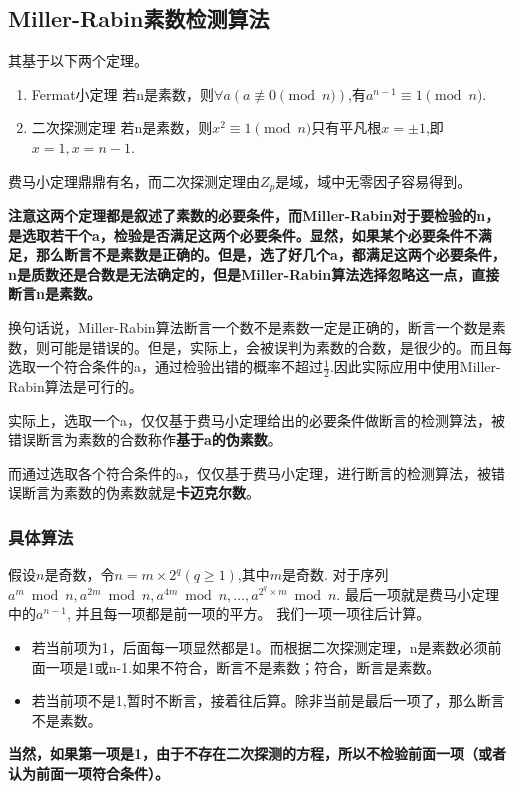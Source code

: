 \subsection{Miller-Rabin素数检测算法}
其基于以下两个定理。
\begin{enumerate}
    \item Fermat小定理 若n是素数，则$\forall a(a \not\equiv 0 \pmod{n})$,有$a^{n-1} \equiv 1 \pmod{n}$.
    \item 二次探测定理 若n是素数，则$x^2 \equiv 1 \pmod{n}$只有平凡根$x=\pm1$,即$x=1,x=n-1$.
\end{enumerate}
费马小定理鼎鼎有名，而二次探测定理由$Z_p$是域，域中无零因子容易得到。
\par \textbf{注意这两个定理都是叙述了素数的必要条件，而Miller-Rabin对于要检验的n，是选取若干个a，检验是否满足这两个必要条件。显然，如果某个必要条件不满足，那么断言不是素数是正确的。但是，选了好几个a，都满足这两个必要条件，n是质数还是合数是无法确定的，但是Miller-Rabin算法选择忽略这一点，直接断言n是素数。}
\par 换句话说，Miller-Rabin算法断言一个数不是素数一定是正确的，断言一个数是素数，则可能是错误的。但是，实际上，会被误判为素数的合数，是很少的。而且每选取一个符合条件的a，通过检验出错的概率不超过$\frac{1}{2}$.因此实际应用中使用Miller-Rabin算法是可行的。
\par 实际上，选取一个a，仅仅基于费马小定理给出的必要条件做断言的检测算法，被错误断言为素数的合数称作\textbf{基于a的伪素数}。
\par 而通过选取各个符合条件的a，仅仅基于费马小定理，进行断言的检测算法，被错误断言为素数的伪素数就是\textbf{卡迈克尔数}。
\subsubsection{具体算法}
假设$n$是奇数，令$n=m \times 2^q (q \geq 1)$,其中$m$是奇数.
对于序列$a^m \bmod n, a^{2m} \bmod n, a^{4m} \bmod n,\ldots,a^{2^q \times m} \bmod n$.
最后一项就是费马小定理中的$a^{n-1}$, 并且每一项都是前一项的平方。
我们一项一项往后计算。
\begin{itemize}
    \item 若当前项为1，后面每一项显然都是1。而根据二次探测定理，n是素数必须前面一项是1或n-1.如果不符合，断言不是素数；符合，断言是素数。
    \item 若当前项不是1,暂时不断言，接着往后算。除非当前是最后一项了，那么断言不是素数。
\end{itemize}
\textbf{当然，如果第一项是1，由于不存在二次探测的方程，所以不检验前面一项（或者认为前面一项符合条件）。}
